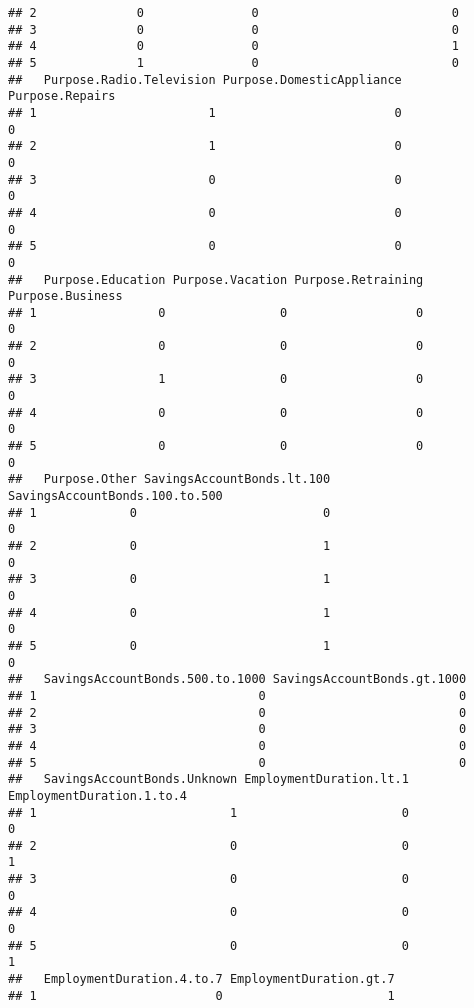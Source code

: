\documentclass[
]{book}
\begin{document}
\begin{verbatim}
## 2              0               0                           0
## 3              0               0                           0
## 4              0               0                           1
## 5              1               0                           0
##   Purpose.Radio.Television Purpose.DomesticAppliance Purpose.Repairs
## 1                        1                         0               0
## 2                        1                         0               0
## 3                        0                         0               0
## 4                        0                         0               0
## 5                        0                         0               0
##   Purpose.Education Purpose.Vacation Purpose.Retraining Purpose.Business
## 1                 0                0                  0                0
## 2                 0                0                  0                0
## 3                 1                0                  0                0
## 4                 0                0                  0                0
## 5                 0                0                  0                0
##   Purpose.Other SavingsAccountBonds.lt.100 SavingsAccountBonds.100.to.500
## 1             0                          0                              0
## 2             0                          1                              0
## 3             0                          1                              0
## 4             0                          1                              0
## 5             0                          1                              0
##   SavingsAccountBonds.500.to.1000 SavingsAccountBonds.gt.1000
## 1                               0                           0
## 2                               0                           0
## 3                               0                           0
## 4                               0                           0
## 5                               0                           0
##   SavingsAccountBonds.Unknown EmploymentDuration.lt.1 EmploymentDuration.1.to.4
## 1                           1                       0                         0
## 2                           0                       0                         1
## 3                           0                       0                         0
## 4                           0                       0                         0
## 5                           0                       0                         1
##   EmploymentDuration.4.to.7 EmploymentDuration.gt.7
## 1                         0                       1

\end{verbatim}
\end{document}

